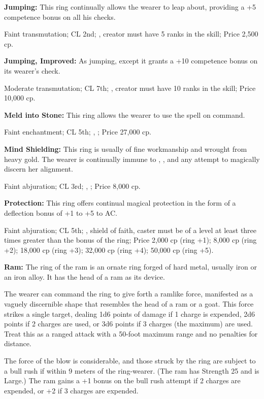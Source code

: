 \textbf{Jumping:} This ring continually allows the wearer to leap about, providing a +5 competence bonus on all his  checks.

Faint transmutation; CL 2nd; , creator must have 5 ranks in the  skill; Price 2,500 cp.

\textbf{Jumping, Improved:} As jumping, except it grants a +10 competence bonus on its wearer's  check.

Moderate transmutation; CL 7th; , creator must have 10 ranks in the  skill; Price 10,000 cp.

\textbf{Meld into Stone:} This ring allows the wearer to use the spell  on command.

Faint enchantment; CL 5th; , ; Price 27,000 cp.

\textbf{Mind Shielding:} This ring is usually of fine workmanship and wrought from heavy gold. The wearer is continually immune to , , and any attempt to magically discern her alignment.

Faint abjuration; CL 3rd; , ; Price 8,000 cp.

\textbf{Protection:} This ring offers continual magical protection in the form of a deflection bonus of +1 to +5 to AC.

Faint abjuration; CL 5th; , shield of faith, caster must be of a level at least three times greater than the bonus of the ring; Price 2,000 cp (ring +1); 8,000 cp (ring +2); 18,000 cp (ring +3); 32,000 cp (ring +4); 50,000 cp (ring +5).

\textbf{Ram:} The ring of the ram is an ornate ring forged of hard metal, usually iron or an iron alloy. It has the head of a ram as its device.

The wearer can command the ring to give forth a ramlike force, manifested as a vaguely discernible shape that resembles the head of a ram or a goat. This force strikes a single target, dealing 1d6 points of damage if 1 charge is expended, 2d6 points if 2 charges are used, or 3d6 points if 3 charges (the maximum) are used. Treat this as a ranged attack with a 50-foot maximum range and no penalties for distance.

The force of the blow is considerable, and those struck by the ring are subject to a bull rush if within 9 meters of the ring-wearer. (The ram has Strength 25 and is Large.) The ram gains a +1 bonus on the bull rush attempt if 2 charges are expended, or +2 if 3 charges are expended.

